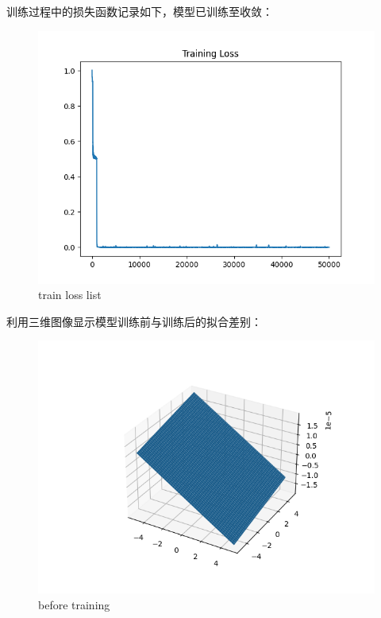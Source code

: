 \documentclass{article}
\begin{document}
训练过程中的损失函数记录如下，模型已训练至收敛：
\begin{figure}[H]
	\centering
	\includegraphics[scale=0.8]{tanh_5.png}
	\caption{train loss list}
\end{figure}

利用三维图像显示模型训练前与训练后的拟合差别：
\begin{figure}[H]
	\centering
	\includegraphics[scale=0.6]{3d1.png}
	\caption{before training}
\end{figure}
\end{document}
